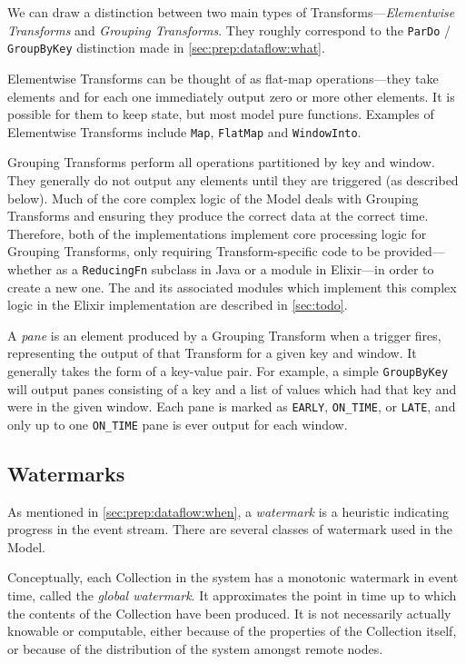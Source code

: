 We can draw a distinction between two main types of Transforms---\emph{Elementwise Transforms} and \emph{Grouping Transforms}.
They roughly correspond to the \verb|ParDo| / \verb|GroupByKey| distinction made in \cref{sec:prep:dataflow:what}.

Elementwise Transforms can be thought of as flat-map operations---they take elements and for each one immediately output zero or more other elements.
It is possible for them to keep state, but most model pure functions.
Examples of Elementwise Transforms include \verb|Map|, \verb|FlatMap| and \verb|WindowInto|.

Grouping Transforms perform all operations partitioned by key and window.
They generally do not output any elements until they are triggered (as described below).
Much of the core complex logic of the Model deals with Grouping Transforms and ensuring they produce the correct data at the correct time.
Therefore, both of the implementations implement core processing logic for Grouping Transforms, only requiring Transform-specific code to be provided---whether as a \verb|ReducingFn| subclass in Java or a  module in Elixir---in order to create a new one.
The  and its associated modules which implement this complex logic in the Elixir implementation are described in \cref{sec:todo}.

A \emph{pane} is an element produced by a Grouping Transform when a trigger fires, representing the output of that Transform for a given key and window.
It generally takes the form of a key-value pair.
For example, a simple \verb|GroupByKey| will output panes consisting of a key and a list of values which had that key and were in the given window.
Each pane is marked as \verb|EARLY|, \verb|ON_TIME|, or \verb|LATE|, and only up to one \verb|ON_TIME| pane is ever output for each window.

\subsection{Watermarks}\label{sec:impl:dataflow:watermarks}


As mentioned in \cref{sec:prep:dataflow:when}, a \emph{watermark} is a heuristic indicating progress in the event stream.
There are several classes of watermark used in the Model.

Conceptually, each Collection in the system has a monotonic watermark in event time, called the \emph{global watermark}.
It approximates the point in time up to which the contents of the Collection have been produced.
It is not necessarily actually knowable or computable, either because of the properties of the Collection itself, or because of the distribution of the system amongst remote nodes.

